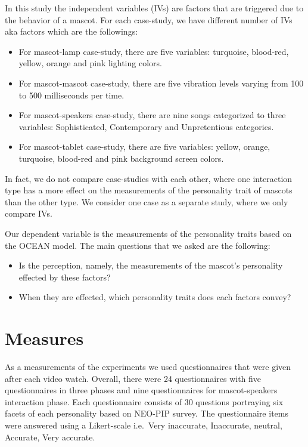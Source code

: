 In this study the independent variables (IVs) are factors that are triggered due to the behavior of a mascot.
For each case-study, we have different number of IVs aka factors which are the followings:
\begin{itemize}
  \item For mascot-lamp case-study, there are five variables: turquoise, blood-red,
  yellow, orange and pink lighting colors.
  \item For mascot-mascot case-study, there are five vibration levels varying from 100 to 500 milliseconds per time.
  \item For mascot-speakers case-study, there are nine songs categorized to three variables:
        Sophisticated, Contemporary and Unpretentious categories.
   \item For mascot-tablet case-study, there are five variables: yellow, orange, turquoise,
        blood-red and pink background screen colors.
\end{itemize}

In fact, we do not compare case-studies with each other, where one interaction type
has a more effect on the measurements of the personality trait of mascots than the other type.
We consider one case as a separate study, where we only compare IVs.

Our dependent variable is the measurements of the personality traits based on the OCEAN model.
The main questions that we asked are the following:
\begin{itemize}
  \item Is the perception, namely, the measurements of the mascot’s personality effected by these factors?
  \item When they are effected, which personality traits does each factors convey?
\end{itemize}

\section{Measures}
\label{sec:measures}
As a measurements of the experiments we used questionnaires that were given after each video watch.
Overall, there were 24 questionnaires with five questionnaires in three phases and nine questionnaires
for mascot-speakers interaction phase.
Each questionnaire consists of 30 questions portraying six facets of each personality based on NEO-PIP survey.
The questionnaire items were answered using a Likert-scale
i.e.\ Very inaccurate, Inaccurate, neutral, Accurate, Very accurate.



